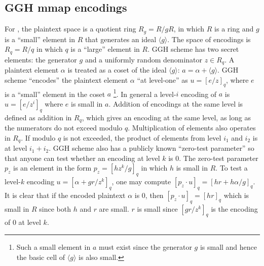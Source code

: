 \documentclass[10pt]{article}
\theoremstyle{plain}
\theoremstyle{definition}
\theoremstyle{remark}
\newcommand{\angles}[1]{\langle #1 \rangle}
\begin{document}
\subsection{GGH mmap encodings}
For \cite{GGH13a}, the plaintext space is a quotient ring $R_g = R/gR$, in which $R$ is a ring and $g$ is a ``small'' element in $R$ that generates an ideal $\angles{g}$. The space of encodings is $R_q = R/q$ in which $q$ is a ``large'' element in $R$. GGH scheme has two secret elements: the generator $g$ and a uniformly random denominator $z \in R_q$. A plaintext element $\alpha$ is treated as a coset of the ideal $\angles{g}$: $a = \alpha + \angles{g}$. GGH scheme ``encodes'' the plaintext element $\alpha$ ``at level-one'' as $u = [e/z]_q$, where $e$ is a ``small'' element in the coset $a$ \footnote{Such a small element in $a$ must exist since the generator $g$ is small and hence the basic cell of $\angles{g}$ is also small.}. In general a level-$i$ encoding of $a$ is $u = [e/z^i]_q$ where $e$ is small in $a$. Addition of encodings at the same level is defined as addition in $R_q$, which gives an encoding at the same level, as long as the numerators do not exceed modulo $q$. Multiplication of elements also operates in $R_q$. If modulo $q$ is not exceeded, the product of elements from level $i_1$ and $i_2$ is at level $i_1 + i_2$.
GGH scheme also has a publicly known ``zero-test parameter'' so that anyone can test whether an encoding at level $k$ is 0. The zero-test parameter $p_z$ is an element in the form $p_z = [hz^k/g]_q$ in which $h$ is small in $R$. To test a level-$k$ encoding $u = [\alpha+gr/z^k]_q$, one may compute $[p_z \cdot u]_q = [hr+h\alpha/g]_q$. It is clear that if the encoded plaintext $\alpha$ is 0, then $[p_z \cdot u]_q = [hr]_q$ which is small in $R$ since both $h$ and $r$ are small. $r$ is small since $[gr/z^k]_q$ is the encoding of 0 at level $k$.
\end{document}
